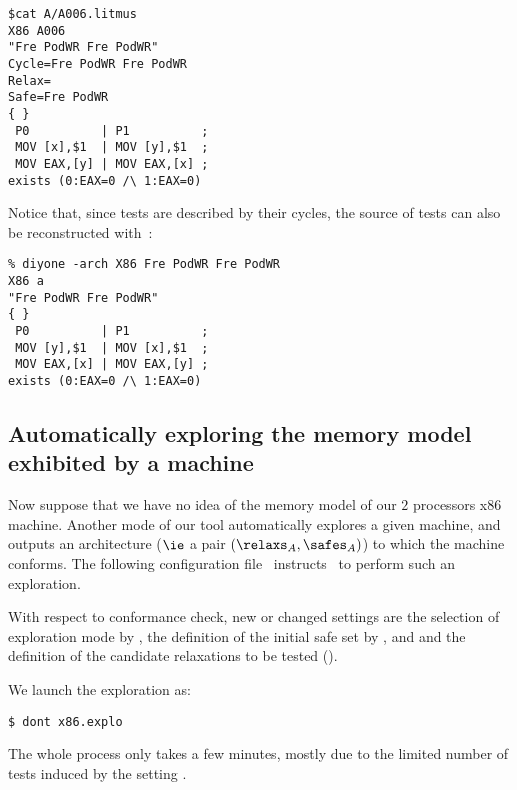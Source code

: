 \begin{verbatim}
$cat A/A006.litmus
X86 A006
"Fre PodWR Fre PodWR"
Cycle=Fre PodWR Fre PodWR
Relax=
Safe=Fre PodWR
{ }
 P0          | P1          ;
 MOV [x],$1  | MOV [y],$1  ;
 MOV EAX,[y] | MOV EAX,[x] ;
exists (0:EAX=0 /\ 1:EAX=0)
\end{verbatim}
Notice that, since tests are described by their cycles,
the source of tests can also be reconstructed with~:
\begin{verbatim}
% diyone -arch X86 Fre PodWR Fre PodWR
X86 a
"Fre PodWR Fre PodWR"
{ }
 P0          | P1          ;
 MOV [y],$1  | MOV [x],$1  ;
 MOV EAX,[x] | MOV EAX,[y] ;
exists (0:EAX=0 /\ 1:EAX=0)
\end{verbatim}

\subsection{Automatically exploring the memory model exhibited by a  machine}
Now suppose that we have no idea of the memory model of
our $2$ processors x86 machine.
Another mode of our \dont{} tool automatically explores a given
machine, and outputs an architecture ($\ie$ a pair $(\relaxs_{A},
\safes_{A})$) to which the machine conforms.
The following configuration file~
instructs~\dont{} to perform such an exploration.

With respect to conformance check, new or changed settings are the selection
of exploration mode by ,
the definition of the initial safe set by ,
and and the definition of the candidate relaxations to be tested
().


We launch the exploration as:
\begin{verbatim}
$ dont x86.explo
\end{verbatim}
The whole process only takes a few minutes, mostly
due to the limited number of tests induced by the setting .

